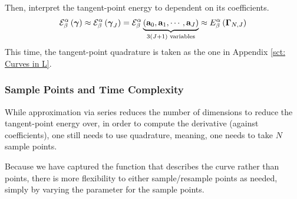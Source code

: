 \documentclass[../dissertation.tex]{subfiles}
\begin{document}
Then, interpret the tangent-point energy to dependent on its coefficients.
\begin{equation}
    \mathcal{E}_{\beta}^{\alpha} \left( \boldsymbol{\gamma} \right)
    \approx
    \mathcal{E}_{\beta}^{\alpha} \left( \boldsymbol{\gamma}_{J} \right)
    =
    \mathcal{E}_{\beta}^{\alpha} \underbrace{\left( \mathbf{a}_{0}, \mathbf{a}_{1}, \cdots, \mathbf{a}_{J} \right)}_{3\left( J+1 \right) \text{ variables}}
    \approx
    E_{\beta}^{\alpha} \left( \boldsymbol{\Gamma}_{N,J} \right)
\end{equation}
This time, the tangent-point quadrature is taken as the one in Appendix \ref{sct: Curves in L}.

\subsubsection{Sample Points and Time Complexity}
While approximation via series reduces the number of dimensions to reduce the tangent-point energy over,
in order to compute the derivative (against coefficients),
one still needs to use quadrature, meaning, one needs to take $N$ sample points.

Because we have captured the function that describes the curve rather than points,
there is more flexibility to either sample/resample points as needed,
simply by varying the parameter for the sample points.
\end{document}

